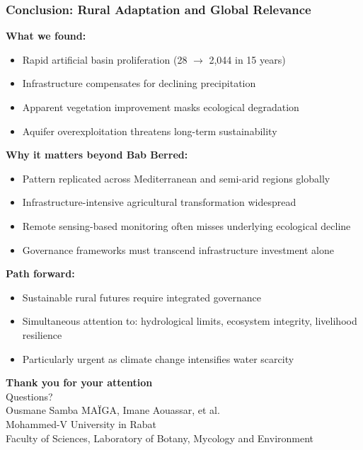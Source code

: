 \documentclass{beamer}
\begin{document}
\begin{frame}
\frametitle{Conclusion: Rural Adaptation and Global Relevance}

\textbf{What we found:}
\begin{itemize}
  \item Rapid artificial basin proliferation (28 $\to$ 2,044 in 15 years)
  \item Infrastructure compensates for declining precipitation
  \item Apparent vegetation improvement masks ecological degradation
  \item Aquifer overexploitation threatens long-term sustainability
\end{itemize}

\textbf{Why it matters beyond Bab Berred:}
\begin{itemize}
  \item Pattern replicated across Mediterranean and semi-arid regions globally
  \item Infrastructure-intensive agricultural transformation widespread
  \item Remote sensing-based monitoring often misses underlying ecological decline
  \item Governance frameworks must transcend infrastructure investment alone
\end{itemize}

\textbf{Path forward:}
\begin{itemize}
  \item Sustainable rural futures require integrated governance
  \item Simultaneous attention to: hydrological limits, ecosystem integrity, livelihood resilience
  \item Particularly urgent as climate change intensifies water scarcity
\end{itemize}

\end{frame}

\begin{frame}[plain]
\begin{center}
  \vfill
  {\Huge \textbf{Thank you for your attention}}
  \\[1cm]
  {\Large Questions?}
  \\[2cm]
  \small{
    Ousmane Samba MAÏGA, Imane Aouassar, et al. \\
    Mohammed-V University in Rabat \\
    Faculty of Sciences, Laboratory of Botany, Mycology and Environment
  }
  \vfill
\end{center}
\end{frame}
\end{document}
